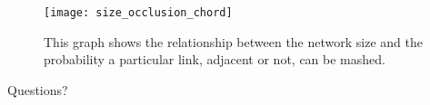 \documentclass[11pt]{beamer}
\begin{document}
    \begin{frame}
        \begin{figure}
            \centering
            \texttt{[image: size\_occlusion\_chord]}
            \caption{This graph shows the relationship between the network size and the probability a particular link, adjacent or not, can be mashed.}
            \label{fig:exp3}
        \end{figure}
    \end{frame}
    
    
    \begin{frame}
        Questions?
    \end{frame}

    
    
    
\end{document}
